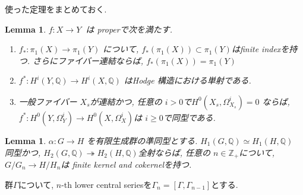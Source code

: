 \documentclass[dvipdfmx,a4paper,11pt]{article} %
\newtheorem{lem}[thm]{Lemma}
\theoremstyle{definition}
\theoremstyle{remark}
\numberwithin{equation}{section}
\newcommand{\N}{\mathbb{Z}_+}
\begin{document}

使った定理をまとめておく. 
\begin{lem}\cite[Lemma 1.2]{Voi}
\label{lem-Voi-1.2}
 \(  f : X \to Y \ \) は properで次を満たす. 
\begin{enumerate}
\item \( f_{*} : \pi_1(X) \to \pi_1(Y) \) について, $ f_{*}(\pi_1(X)) \subset \pi_1(Y)$はfinite indexを持つ. さらにファイバー連結ならば,  $f_{*}(\pi_1(X)) =  \pi_1(Y)$
\item  \( f^* : H^i(Y,\mathbb{Q}) \to H^i(X,\mathbb{Q}) \) はHodge 構造における単射である. 
\item  一般ファイバー \( X_s \)が連結かつ, 任意の \( i>0 \)で\( H^0(X_s,\Omega^i_{X_s}) = 0 \)
ならば, \( f^* : H^0(Y,\Omega^i_Y) \to H^0(X,\Omega^i_X) \)は \( i \ge 0 \)で同型である. 
\end{enumerate}
\end{lem}

\begin{lem}\cite[Lemma 3.24]{Voi}\cite[Proposition 6.2]{Wang22}
\label{lem-Voi-3.24}
\( \alpha : G \to H \) を有限生成群の準同型とする. 
\( H_1(G, \mathbb{Q}) \simeq H_1(H, \mathbb{Q}) \) 同型かつ, 
\( H_2(G, \mathbb{Q}) \twoheadrightarrow  H_2(H, \mathbb{Q}) \)全射ならば, 
任意の \( n \in \N \)について,  \( G/G_n \to H/H_n \)は finite kernel and cokernelを持つ. 

\end{lem}
群$\Gamma$について, $n$-th lower central seriesを\( \Gamma_n = [\Gamma, \Gamma_{n-1}] \)とする. 
\end{document}
